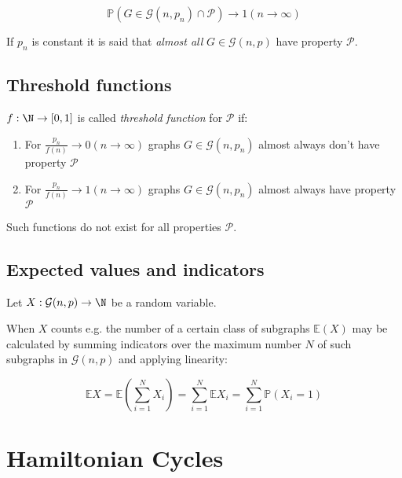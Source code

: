 $$\mathbb{P}(G \in \mathcal{G}(n,p_n) \cap \mathcal{P}) \to 1 (n \to \infty)$$

If $p_n$ is constant it is said that \emph{almost all} $G \in \mathcal{G}(n,p)$ have property $\mathcal{P}$.

\subsection*{Threshold functions}

$f : \N \to [0,1]$ is called \emph{threshold function} for $\mathcal{P}$ if:

\begin{enumerate}
	\item For $\frac{p_n}{f(n)} \to 0 (n \to \infty)$ graphs $G \in \mathcal{G}(n,p_n)$ almost always don't have property $\mathcal{P}$
	\item For $\frac{p_n}{f(n)} \to 1 (n \to \infty)$ graphs $G \in \mathcal{G}(n,p_n)$ almost always have property $\mathcal{P}$
\end{enumerate}

Such functions do not exist for all properties $\mathcal{P}$.

\subsection*{Expected values and indicators}

Let $X : \mathcal{G}(n,p) \to \N$ be a random variable.

When $X$ counts e.g. the number of a certain class of subgraphs $\mathbb{E}(X)$ may be calculated by summing indicators over the maximum number $N$ of such subgraphs in $\mathcal{G}(n,p)$ and applying linearity:

\vspace*{-4mm}
$$\mathbb{E}X = \mathbb{E}\left(\sum_{i=1}^N X_i\right) = \sum_{i=1}^N \mathbb{E}X_i = \sum_{i=1}^N \mathbb{P}(X_i=1)$$

\section*{Hamiltonian Cycles}
